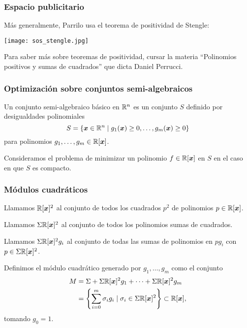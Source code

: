 \documentclass[aspectratio=169,12pt,spanish]{beamer}
\begin{document}

\begin{frame}

\frametitle{Espacio publicitario}

Más generalmente, Parrilo usa el teorema de positividad de Stengle:

\begin{center}
\texttt{[image: sos\_stengle.jpg]}
\end{center}
Para saber más sobre teoremas de positividad, cursar la materia ``Polinomios positivos y sumas de cuadrados'' que dicta Daniel Perrucci.


\end{frame}



\begin{frame}

\frametitle{Optimización sobre conjuntos semi-algebraicos}

Un conjunto semi-algebraico básico en $\mathbb{R}^n$ es un conjunto $S$ definido por desigualdades polinomiales
$$
S = \{\bm{x} \in \mathbb{R}^n \mid g_1(\bm{x}) \ge 0, \dots, g_m(\bm{x}) \ge 0\}
$$
para polinomios $g_1, \dots, g_m \in \mathbb{R}[\bm{x}]$.

Consideramos el problema de minimizar un polinomio $f \in \mathbb{R}[\bm{x}]$ en $S$ en el caso en que $S$ es compacto.



\end{frame}


\begin{frame}

\frametitle{Módulos cuadráticos}

Llamamos $\mathbb{R}[\bm{x}]^2$ al conjunto de todos los cuadrados $p^2$ de polinomios $p \in \mathbb{R}[\bm{x}]$.

Llamamos $\Sigma\mathbb{R}[\bm{x}]^2$ al conjunto de todos los polinomios sumas de cuadrados.

Llamamos $\Sigma\mathbb{R}[\bm{x}]^2 g_i$ al conjunto de todas las sumas de polinomios en $p g_i$ con $p \in \Sigma\mathbb{R}[\bm{x}]^2$.

Definimos el módulo cuadrático generado por $g_1, \dots, g_m$ como el conjunto
\begin{align*}
M &= \Sigma + \Sigma\mathbb{R}[\bm{x}]^2 g_1 + \cdots +  \Sigma\mathbb{R}[\bm{x}]^2 g_m \\
&= \left\{ \sum_{i=0}^m \sigma_i g_i \mid \sigma_i \in \Sigma\mathbb{R}[\bm{x}]^2 \right\} \subset \mathbb{R}[\bm{x}],
\end{align*}
tomando $g_0 = 1$.



\end{frame}
\end{document}
